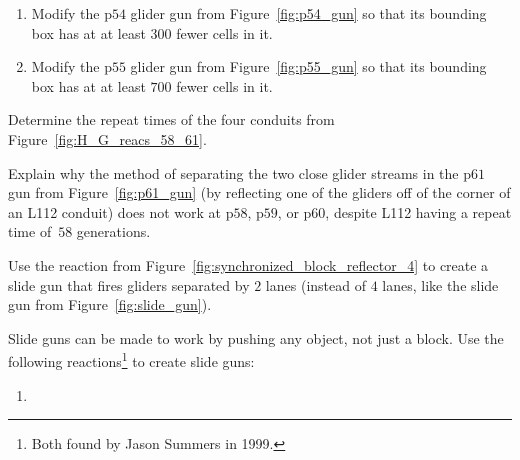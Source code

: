 \begin{multicols}{2}
\begin{problem}
		\begin{enumerate}[label=\bf\color{ocre}(\alph*)]
			\item Modify the p$54$ glider gun from Figure~\ref{fig:p54_gun} so that its bounding box has at at least $300$ fewer cells in it.
			
			\item Modify the p$55$ glider gun from Figure~\ref{fig:p55_gun} so that its bounding box has at at least $700$ fewer cells in it.
		\end{enumerate}
	\end{problem}
	
	
	\mfilbreak
	
	
	\begin{problem}\label{exer:H_G_reacs_58_61}
		Determine the repeat times of the four conduits from Figure~\ref{fig:H_G_reacs_58_61}.
	\end{problem}
	
	
	\mfilbreak
	
	
	\begin{problem}\label{exer:p61_gun_reflection_no_60}
		Explain why the method of separating the two close glider streams in the p$61$ gun from Figure~\ref{fig:p61_gun} (by reflecting one of the gliders off of the corner of an L112 conduit) does not work at p$58$, p$59$, or p$60$, despite L112 having a repeat time of~$58$ generations.
	\end{problem}
	
	
	\mfilbreak
	
	
	\begin{problem}\label{exer:2_lane_slide_gun}
		Use the reaction from Figure~\ref{fig:synchronized_block_reflector_4} to create a slide gun that fires gliders separated by $2$ lanes (instead of $4$ lanes, like the slide gun from Figure~\ref{fig:slide_gun}).
	\end{problem}
	
	
	\mfilbreak
	
	
	\begin{problem}\label{exer:slide_gun_honey_farm}
		Slide guns can be made to work by pushing any object, not just a block. Use the following reactions\footnote{Both found by Jason Summers in 1999.} to create slide guns:\\[0.05cm]
		
		\begin{enumerate}[label=\bf\color{ocre}(\alph*)]
			\item {}\\[0.1cm]
			

\end{enumerate}
\end{problem}
\end{multicols}
